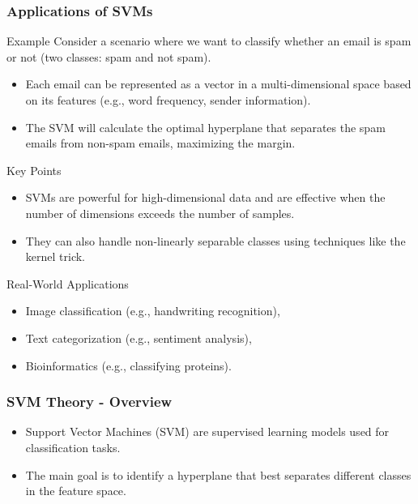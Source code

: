 \documentclass[aspectratio=169]{beamer}
\begin{document}
\begin{frame}[fragile]
    \frametitle{Applications of SVMs}
    \begin{block}{Example}
        Consider a scenario where we want to classify whether an email is spam or not (two classes: spam and not spam).
        \begin{itemize}
            \item Each email can be represented as a vector in a multi-dimensional space based on its features (e.g., word frequency, sender information).
            \item The SVM will calculate the optimal hyperplane that separates the spam emails from non-spam emails, maximizing the margin.
        \end{itemize}
    \end{block}
    
    \begin{block}{Key Points}
        \begin{itemize}
            \item SVMs are powerful for high-dimensional data and are effective when the number of dimensions exceeds the number of samples.
            \item They can also handle non-linearly separable classes using techniques like the kernel trick.
        \end{itemize}
    \end{block}
    
    \begin{block}{Real-World Applications}
        \begin{itemize}
            \item Image classification (e.g., handwriting recognition),
            \item Text categorization (e.g., sentiment analysis),
            \item Bioinformatics (e.g., classifying proteins).
        \end{itemize}
    \end{block}
\end{frame}

\begin{frame}[fragile]
    \frametitle{SVM Theory - Overview}
    \begin{itemize}
        \item Support Vector Machines (SVM) are supervised learning models used for classification tasks.
        \item The main goal is to identify a hyperplane that best separates different classes in the feature space.
    \end{itemize}
\end{frame}
\end{document}
